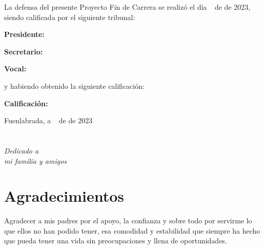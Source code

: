 \documentclass[a4paper, 12pt]{book}
\begin{document}
\vspace{1cm}
La defensa del presente Proyecto Fin de Carrera se realizó el día \qquad$\;\,$ de \qquad\qquad\qquad\qquad \newline de 2023, siendo calificada por el siguiente tribunal:


\vspace{0.5cm}
\textbf{Presidente:}

\vspace{1.2cm}
\textbf{Secretario:}

\vspace{1.2cm}
\textbf{Vocal:}


\vspace{1.2cm}
y habiendo obtenido la siguiente calificación:

\vspace{1cm}
\textbf{Calificación:}


\vspace{1cm}
\begin{flushright}
Fuenlabrada, a \qquad$\;\,$ de \qquad\qquad\qquad\qquad de 2023
\end{flushright}


\chapter*{}
\begin{flushright}
\textit{Dedicado a \\
mi familia y amigos}
\end{flushright}


\chapter*{Agradecimientos}

Agradecer a mis padres por el apoyo, la confianza y sobre todo por servirme lo que ellos no han podido tener, esa comodidad y estabilidad que siempre ha hecho que pueda tener una vida sin preocupaciones y llena de oportunidades.
\end{document}
